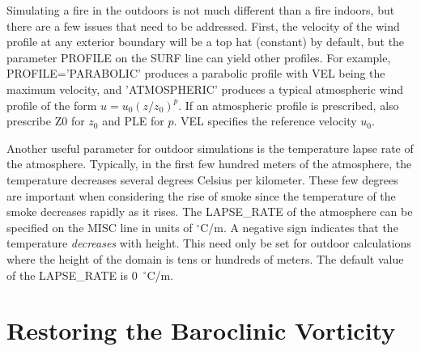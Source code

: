 \documentclass[11pt]{book}
\begin{document}
Simulating a fire in the outdoors is not much different than a fire
indoors, but there are a few issues that need to be addressed.
First, the velocity of the wind profile at any exterior boundary will be a top hat (constant) by default,
but the parameter {\ct PROFILE} on the {\ct SURF} line
can yield other profiles.
For example, {\ct PROFILE='PARABOLIC'} produces a parabolic profile with
{\ct VEL} being the maximum velocity,
and {\ct 'ATMOSPHERIC'} produces a typical atmospheric wind
profile of the form $u=u_0 (z/z_0)^p$. If an atmospheric profile is
prescribed, also prescribe {\ct Z0} for $z_0$  and {\ct PLE} for $p$.
{\ct VEL} specifies the reference velocity $u_0$.

Another useful parameter for outdoor simulations is the temperature
lapse rate of the atmosphere. Typically, in the first few hundred meters
of the atmosphere, the temperature decreases several degrees Celsius
per kilometer. These few degrees are important when considering the rise
of smoke since the temperature of the smoke decreases rapidly as it
rises. The {\ct LAPSE\_RATE} of the atmosphere can be specified on the
{\ct MISC} line in units of $^\circ$C/m. A negative sign indicates that the
temperature {\em decreases} with height.
This need only be set for outdoor calculations where the height of the
domain is tens or hundreds of meters.
The default value of the {\ct LAPSE\_RATE} is 0~$^\circ$C/m.

\section{Restoring the Baroclinic Vorticity}
\end{document}

